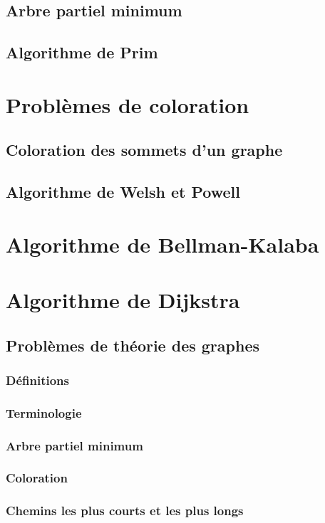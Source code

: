 \subsection{Arbre partiel minimum}\label{subsec:arbrepm}
\subsection{Algorithme de Prim}\label{subsec:algodeprim}
\section{Problèmes de coloration}\label{sec:coloration}
\subsection{Coloration des sommets d'un graphe}\label{subsec:sommets}
\subsection{Algorithme de Welsh et Powell}\label{subsec:algowelshpowell}
\section{Algorithme de Bellman-Kalaba}\label{sec:algobellmankalaba}
\section{Algorithme de Dijkstra}\label{sec:algodijkstra}

\newpage
\subsection{Problèmes de théorie des graphes}
\subsubsection{Définitions}
\subsubsection{Terminologie}
\subsubsection{Arbre partiel minimum}
\subsubsection{Coloration}
\subsubsection{Chemins les plus courts et les plus longs}

